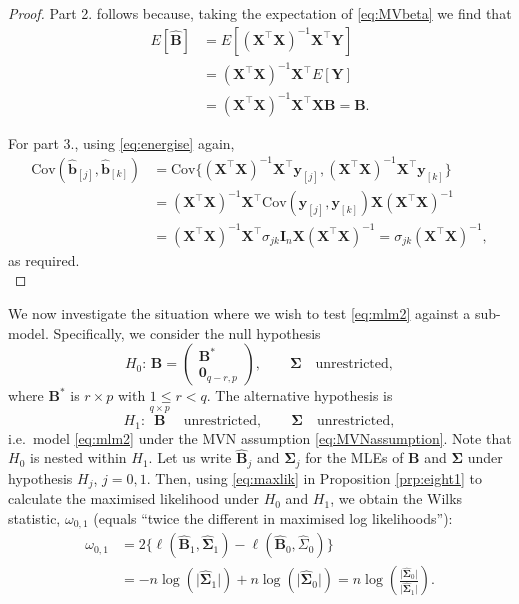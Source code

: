 \documentclass[]{book}
\theoremstyle{definition}
\theoremstyle{definition}
\theoremstyle{definition}
\theoremstyle{remark}
\begin{document}
\begin{proof}
Part 2. follows because, taking the expectation of \eqref{eq:MVbeta} we find that
\begin{align*}
E[\hat{\boldsymbol B}]&=E[(\boldsymbol X^\top \boldsymbol X)^{-1}\boldsymbol X^\top \boldsymbol Y]\\
&=(\boldsymbol X^\top \boldsymbol X)^{-1}\boldsymbol X^\top E[\boldsymbol Y]\\
&=(\boldsymbol X^\top \boldsymbol X)^{-1}\boldsymbol X^\top \boldsymbol X\boldsymbol B=\boldsymbol B.
\end{align*}

For part 3., using \eqref{eq:energise} again,
\begin{align*}
\text{Cov}(\hat{\boldsymbol b}_{[j]}, \hat{\boldsymbol b}_{[k]})&=\text{Cov}\{(\boldsymbol X^\top \boldsymbol X)^{-1}\boldsymbol X^\top \boldsymbol y_{[j]}, (\boldsymbol X^\top \boldsymbol X)^{-1} \boldsymbol X^\top \boldsymbol y_{[k]}\}\\
&=(\boldsymbol X^\top \boldsymbol X)^{-1}\boldsymbol X^\top \text{Cov}(\boldsymbol y_{[j]}, \boldsymbol y_{[k]}) \boldsymbol X(\boldsymbol X^\top \boldsymbol X)^{-1}\\
&=(\boldsymbol X^\top \boldsymbol X)^{-1} \boldsymbol X^\top \sigma_{jk}\boldsymbol I_n\boldsymbol X(\boldsymbol X^\top \boldsymbol X)^{-1}=\sigma_{jk}(\boldsymbol X^\top \boldsymbol X)^{-1},
\end{align*}
as required.\\
\end{proof}

We now investigate the situation where we wish to test \eqref{eq:mlm2} against a sub-model. Specifically, we consider the null hypothesis
\[
H_0: \, \boldsymbol B=\begin{pmatrix}\boldsymbol B^\ast \\{\mathbf 0}_{q-r,p} \end{pmatrix}, \qquad \boldsymbol \Sigma\quad \text{unrestricted},
\]
where \(\boldsymbol B^\ast\) is \(r \times p\) with \(1 \leq r <q\). The alternative hypothesis is
\[
H_1: \, \stackrel{q \times p}{\boldsymbol B} \quad \text{unrestricted}, \qquad \boldsymbol \Sigma\quad
\text{unrestricted},
\]
i.e.~model \eqref{eq:mlm2} under the MVN assumption \eqref{eq:MVNassumption}. Note that \(H_0\) is nested within \(H_1\).
Let us write \(\hat{\boldsymbol B}_j\) and \(\hat{\boldsymbol \Sigma}_j\) for the MLEs of \(\boldsymbol B\) and \(\boldsymbol \Sigma\) under hypothesis \(H_j\), \(j=0,1\). Then, using \eqref{eq:maxlik} in Proposition \ref{prp:eight1} to calculate the maximised likelihood under \(H_0\) and \(H_1\), we obtain the Wilks statistic, \(\omega_{0,1}\) (equals ``twice the different in maximised log likelihoods''):
\begin{align*}
\omega_{0,1}&=2\{\ell(\hat{\boldsymbol B}_1, \hat{\boldsymbol \Sigma}_1)-\ell(\hat{\boldsymbol B}_0, \hat{\Sigma}_0)\}\\
&= - n\log(\vert \hat{\boldsymbol \Sigma}_1\vert) + n\log (\vert \hat{\boldsymbol \Sigma}_0\vert)
=n\log \left ( \frac{\vert \hat{\boldsymbol \Sigma}_0 \vert}{\vert \hat{\boldsymbol \Sigma}_1\vert}  \right).
\end{align*}
\end{document}
